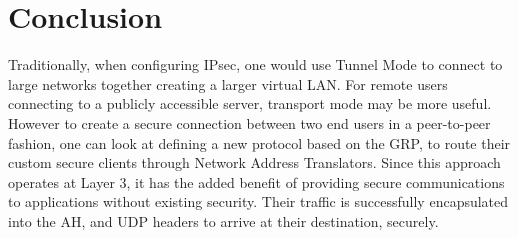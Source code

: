 \documentclass[conference,12pt]{IEEEtran}
\begin{document}
\section{Conclusion}
Traditionally, when configuring IPsec, one would use Tunnel Mode to connect to
large networks together creating a larger virtual LAN. For remote users
connecting to a publicly accessible server, transport mode may be more useful.
However to create a secure connection between two end users in a peer-to-peer
fashion, one can look at defining
a new protocol based on the GRP, to route their custom secure clients through
Network Address Translators. Since this approach operates at Layer 3, it has the
added benefit of providing secure communications to applications without
existing security. Their traffic is successfully encapsulated into the AH, and
UDP headers to arrive at their destination, securely.



\printbibliography
\end{document}
